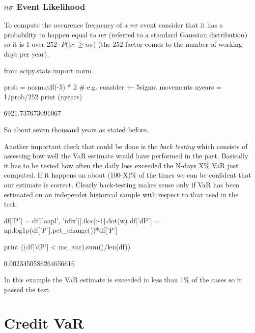 \begin{attention}
\subsubsection{$n\sigma$ Event Likelihood}
To compute the occurence frequency of a $n\sigma$ event consider that it has a probability to happen equal to $n\sigma$ (referred to a standard Gaussian distribution) so it is 1 over $252\cdot P(|x| \ge n\sigma$) (the 252 factor comes to the number of working days per year).

\begin{attpython}
from scipy.stats import norm

prob = norm.cdf(-5) * 2 # e.g. consider +- 5sigma movements
nyears = 1/prob/252
print (nyears)
\end{attpython}
\begin{ioutput}
6921.737673091067
\end{ioutput}
\noindent
So about seven thousand years as stated before.
\end{attention}

Another important check that could be done is the \emph{back testing} which consists of assessing how well the VaR estimate would have performed in the past. Basically it has to be tested how often the daily loss exceeded the N-days X\% VaR just computed. If it happens on about (100-X)\% of the times we can be confident that our estimate is correct. Clearly back-testing makes sense only if VaR has been estimated on an independet historical sample with respect to that used in the test.

\begin{ipython}
df['P'] = df[['aapl', 'nflx']].iloc[:-1].dot(w)
df['dP'] = np.log1p(df['P'].pct_change())*df['P']

print ((df['dP'] < mc_var).sum()/len(df))
\end{ipython}
\begin{ioutput}
0.0023450586264656616
\end{ioutput}

In this example the VaR estimate is exceeded in less than 1\% of the cases so it passed the test.

\section{Credit VaR}
\label{credit-var-cr-var}


